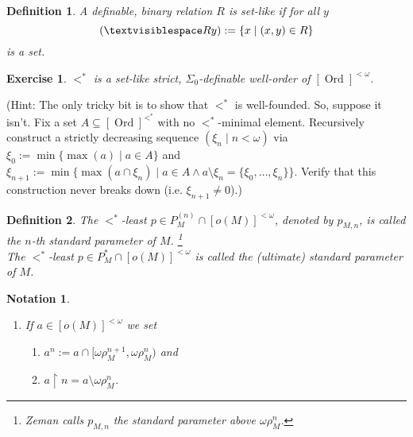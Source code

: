 \documentclass[12pt,a4paper]{article}
\theoremstyle{nicestyle}
\newtheorem{exercise}{Exercise}[subsection]
\newtheorem{definition}{Definition}[subsection]
\newtheorem{notation}{Notation}[subsection]
\DeclareMathOperator{\ord}{Ord}
\DeclareMathOperator{\otp}{otp}
\begin{document}
  \begin{definition}
    A definable, binary relation $R$ is \emph{set-like} if for all $y$
    \[
      ( \textvisiblespace R y) := \{ x \mid (x,y) \in R \} 
    \]
    is a set.
  \end{definition}

  \begin{exercise}
    $<^{*}$ is a set-like strict, $\Sigma_{0}$-definable well-order of
    $[\ord]^{< \omega}$.
  \end{exercise}

  (Hint: The only tricky bit is to show that $<^{*}$ is
  well-founded. So, suppose it isn't. Fix a set
  $A \subseteq [\ord]^{<^{*}}$ with no $<^{*}$-minimal
  element. Recursively construct a strictly decreasing sequence
  $(\xi_{n} \mid n < \omega)$ via
  $\xi_{0} := \min \{ \max(a) \mid a \in A \}$ and
  $\xi_{n+1} := \min \{ \max(a \cap \xi_{n}) \mid a \in A \wedge a
  \setminus \xi_{n} = \{ \xi_{0}, \ldots, \xi_{n} \}\}$. Verify that
  this construction never breaks down (i.e. $\xi_{n+1} \neq 0$).)


  \begin{definition}
    The $<^{*}$-least $p \in P^{(n)}_{M} \cap [o(M)]^{< \omega}$,
    denoted by $p_{M,n}$, is called the \emph{$n$-th standard
      parameter of $M$}. \footnote{Zeman calls $p_{M,n}$ the standard
      parameter above $\omega \rho^{n}_{M}$.} \\
    The $<^{*}$-least $p \in P^{*}_{M} \cap [o(M)]^{<\omega}$ is
    called the \emph{(ultimate) standard parameter of $M$}.
  \end{definition}

    \begin{notation}
    \begin{enumerate}
    \item If $a \in [o(M)]^{< \omega}$ we set
      \begin{enumerate}
      \item $a^{n} := a \cap [ \omega\rho^{n+1}_{M}, \omega\rho^{n}_{M})$ and
      \item $a \restriction n = a \setminus \omega\rho^{n}_{M}$.
      \end{enumerate}
    \end{enumerate}
  \end{notation}
  
\end{document}

